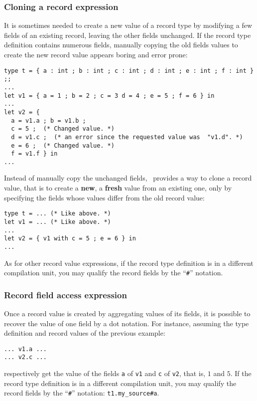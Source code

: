 \subsubsection{Cloning a record expression}
\label{record-clone-expression}
 It is sometimes needed to create a new
value of a record type by modifying a few fields of an existing
record, leaving the other fields unchanged. If the record type
definition contains numerous fields, manually copying the old fields
values to create the new record value appears boring and error prone:
{\scriptsize
\begin{lstlisting}
type t = { a : int ; b : int ; c : int ; d : int ; e : int ; f : int } ;;
...
let v1 = { a = 1 ; b = 2 ; c = 3 d = 4 ; e = 5 ; f = 6 } in
...
let v2 = {
  a = v1.a ; b = v1.b ;
  c = 5 ;  (* Changed value. *)
  d = v1.c ;  (* an error since the requested value was  "v1.d". *)
  e = 6 ;  (* Changed value. *)
  f = v1.f } in
...
\end{lstlisting}
}
Instead of manually copy the unchanged fields, \focal\ provides a way
to clone a record value, that is to create a {\bf new}, a {\bf fresh}
value from an existing one,  only by specifying the fields whose values
differ from the old record value:
{\scriptsize
\begin{lstlisting}
type t = ... (* Like above. *)
let v1 = ... (* Like above. *)
...
let v2 = { v1 with c = 5 ; e = 6 } in
...
\end{lstlisting}
}
As for other record value expressions, if the record type definition
is in a different compilation unit, you may qualify the record fields
by the ``{\tt\#}'' notation.



\subsubsection{Record field access expression}
\label{record-field-access}
Once a record value is created by aggregating values of its fields, it
is possible to recover the value of one field by a dot notation. For
instance, assuming the type definition and record values of the
previous example:
{\scriptsize
\begin{lstlisting}
... v1.a ...
... v2.c ...
\end{lstlisting}
}
respectively get the value of the fields {\tt a} of {\tt v1} and
{\tt c} of {\tt v2}, that is, $1$ and $5$. If the record type
definition is in a different compilation unit, you may qualify the
record fields by the ``{\tt\#}'' notation: {\tt t1.my\_source\#a}.



